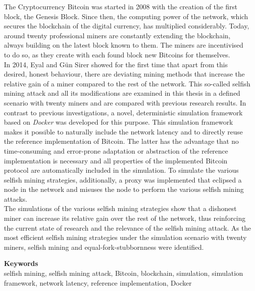 The Cryptocurrency Bitcoin was started in 2008 with the creation of the first block, the Genesis Block. 
Since then, the computing power of the network, which secures the blockchain of the digital currency, has multiplied considerably.
Today, around twenty professional miners are constantly extending the blockchain, always building on the latest block known to them.
The miners are incentivised to do so, as they create with each
found block new Bitcoins for themselves.\\
In 2014, Eyal and Gün Sirer showed for the first time that apart from this desired, honest behaviour, there are deviating mining methods that increase the relative gain of a miner compared to the rest of the network.
This so-called selfish mining attack and all its modifications are examined in this thesis in a defined scenario with twenty miners and are compared with previous research results.
In contrast to previous investigations, a novel, deterministic simulation framework based on \textit{Docker} was developed for this purpose.
This simulation framework makes it possible to naturally include the network latency and to directly reuse the reference implementation of Bitcoin.
The latter has the advantage that no time-consuming and error-prone adaptation or abstraction of the reference implementation is necessary and all properties of the implemented Bitcoin protocol are automatically included in the simulation.
To simulate the various selfish mining strategies, additionally, a proxy was implemented that eclipsed a node in the network and misuses the node to perform the various selfish mining attacks.\\
The simulations of the various selfish mining strategies show that a dishonest miner can increase its relative gain over the rest of the network, thus reinforcing the current state of research and the relevance of the selfish mining attack.
As the most efficient selfish mining strategies under the simulation scenario with twenty miners, selfish mining and equal-fork-stubbornness were identified.

\bigskip
\noindent \textbf{Keywords}\\
selfish mining, selfish mining attack, Bitcoin, blockchain, simulation, simulation framework, network latency, reference implementation, Docker